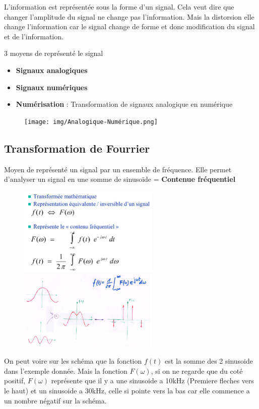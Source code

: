 	
	L'information est représentée sous la forme d'un signal. Cela veut dire que changer l'amplitude du signal ne change pas l'information. Mais la distorsion elle change l'information car le signal change de forme et donc modification du signal et de l'information.
	
	3 moyens de représenté le signal
	\begin{itemize}
		\item \textbf{Signaux analogiques}
		\item \textbf{Signaux numériques}
		\item \textbf{Numérisation} : Transformation de signaux analogique en numérique
	\end{itemize}
		\begin{figure}[H]
			\centering
			\texttt{[image: img/Analogique-Numérique.png]}
		\end{figure}
		
	\subsection{Transformation de Fourrier}
		Moyen de représenté un signal par un ensemble de fréquence. Elle permet d'analyser un signal en une somme de sinusoïde = \textbf{Contenue fréquentiel}
		\begin{figure}[H]
			\centering
			\includegraphics[width=0.6\textwidth]{img/Fourrier.png}
			\includegraphics[width=0.6\textwidth]{img/FourrierExemple.png}
		\end{figure}
		
		On peut voire sur les schéma que la fonction $f(t)$ est la somme des 2 sinusoide dans l'exemple donnée. Mais la fonction $F(\omega)$, si on ne regarde que du coté positif, $F(\omega)$ représente que il y a une sinusoide a 10kHz (Premiere fleches vers le haut) et un sinusoide a 30kHz, celle si pointe vers la bas car elle commence a un nombre négatif sur la schéma.
		
